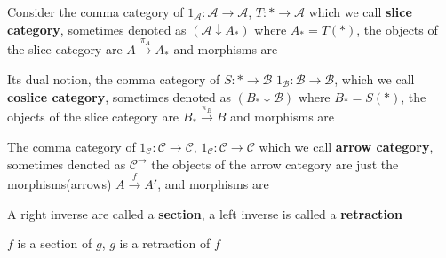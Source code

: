 \documentclass[main]{subfiles}
\begin{document}
\begin{definition}
Consider the comma category of $1_{\mathscr A}:\mathscr A\to\mathscr A$, $T:*\to\mathscr A$ which we call \textbf{slice category}, sometimes denoted as $(\mathscr A\downarrow A_*)$ where $A_*=T(*)$, the objects of the slice category are $A\xrightarrow{\pi_A}A_*$ and morphisms are
\begin{center}
\end{center}
Its dual notion, the comma category of $S:*\to\mathscr B$ $1_{\mathscr B}:\mathscr B\to\mathscr B$, which we call \textbf{coslice category}, sometimes denoted as $(B_*\downarrow\mathscr B)$ where $B_*=S(*)$, the objects of the slice category are $B_*\xrightarrow{\pi_B}B$ and morphisms are
\begin{center}
\end{center}
The comma category of $1_{\mathscr C}:\mathscr C\to\mathscr C$, $1_{\mathscr C}:\mathscr C\to\mathscr C$ which we call \textbf{arrow category}, sometimes denoted as $\mathscr C^{\to}$ the objects of the arrow category are just the morphisms(arrows) $A\xrightarrow{f}A'$, and morphisms are
\begin{center}
\end{center}
\end{definition}

\begin{definition}
A right inverse are called a \textbf{section}, a left inverse is called a \textbf{retraction}
\begin{center}
\end{center}
$f$ is a section of $g$, $g$ is a retraction of $f$
\end{definition}
\end{document}
